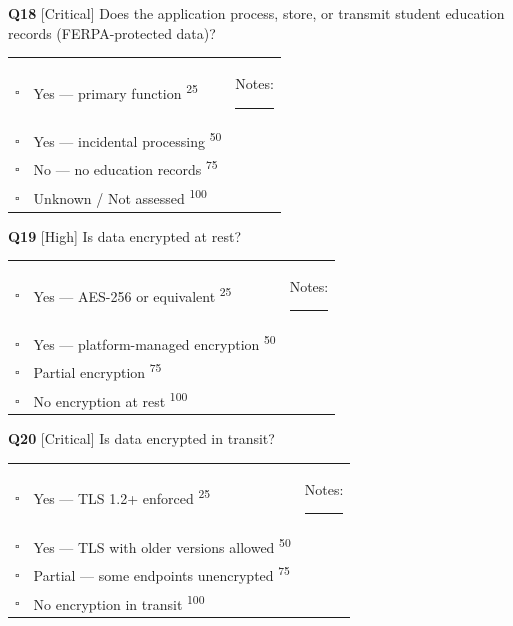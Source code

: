 \documentclass[11pt,landscape]{article}
\begin{document}
\vspace{0.2cm}

\noindent\colorbox{critbg}{\textbf{Q18} [Critical]} Does the application process, store, or transmit student education records (FERPA-protected data)?

\begin{tabularx}{\textwidth}{cXX}
$\square$ & Yes --- primary function \textsuperscript{\scriptsize\textcolor{stridegray}{25}} & Notes: \rule{4cm}{0.4pt} \\
$\square$ & Yes --- incidental processing \textsuperscript{\scriptsize\textcolor{stridegray}{50}} &  \\
$\square$ & No --- no education records \textsuperscript{\scriptsize\textcolor{stridegray}{75}} &  \\
$\square$ & Unknown / Not assessed \textsuperscript{\scriptsize\textcolor{stridegray}{100}} &  \\
\end{tabularx}

\vspace{0.3cm}

\noindent\colorbox{highbg}{\textbf{Q19} [High]} Is data encrypted at rest?

\begin{tabularx}{\textwidth}{cXX}
$\square$ & Yes --- AES-256 or equivalent \textsuperscript{\scriptsize\textcolor{stridegray}{25}} & Notes: \rule{4cm}{0.4pt} \\
$\square$ & Yes --- platform-managed encryption \textsuperscript{\scriptsize\textcolor{stridegray}{50}} &  \\
$\square$ & Partial encryption \textsuperscript{\scriptsize\textcolor{stridegray}{75}} &  \\
$\square$ & No encryption at rest \textsuperscript{\scriptsize\textcolor{stridegray}{100}} &  \\
\end{tabularx}

\vspace{0.3cm}

\noindent\colorbox{critbg}{\textbf{Q20} [Critical]} Is data encrypted in transit?

\begin{tabularx}{\textwidth}{cXX}
$\square$ & Yes --- TLS 1.2+ enforced \textsuperscript{\scriptsize\textcolor{stridegray}{25}} & Notes: \rule{4cm}{0.4pt} \\
$\square$ & Yes --- TLS with older versions allowed \textsuperscript{\scriptsize\textcolor{stridegray}{50}} &  \\
$\square$ & Partial --- some endpoints unencrypted \textsuperscript{\scriptsize\textcolor{stridegray}{75}} &  \\
$\square$ & No encryption in transit \textsuperscript{\scriptsize\textcolor{stridegray}{100}} &  \\
\end{tabularx}
\end{document}
